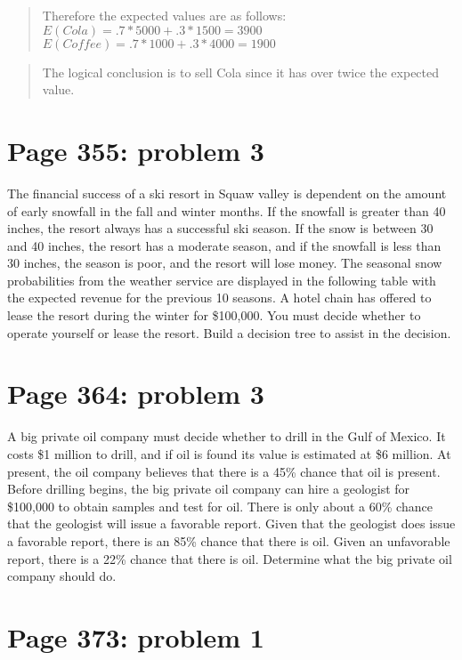 \documentclass[]{article}
\begin{document}
\begin{quote}
Therefore the expected values are as follows:\\
\(E(Cola) = .7 * 5000 + .3 * 1500 = 3900\)\\
\(E(Coffee) = .7 * 1000 + .3 * 4000 = 1900\)
\end{quote}

\begin{quote}
The logical conclusion is to sell Cola since it has over twice the
expected value.
\end{quote}

\section{Page 355: problem 3}\label{page-355-problem-3}

The financial success of a ski resort in Squaw valley is dependent on
the amount of early snowfall in the fall and winter months. If the
snowfall is greater than 40 inches, the resort always has a successful
ski season. If the snow is between 30 and 40 inches, the resort has a
moderate season, and if the snowfall is less than 30 inches, the season
is poor, and the resort will lose money. The seasonal snow probabilities
from the weather service are displayed in the following table with the
expected revenue for the previous 10 seasons. A hotel chain has offered
to lease the resort during the winter for \$100,000. You must decide
whether to operate yourself or lease the resort. Build a decision tree
to assist in the decision.

\section{Page 364: problem 3}\label{page-364-problem-3}

A big private oil company must decide whether to drill in the Gulf of
Mexico. It costs \$1 million to drill, and if oil is found its value is
estimated at \$6 million. At present, the oil company believes that
there is a 45\% chance that oil is present. Before drilling begins, the
big private oil company can hire a geologist for \$100,000 to obtain
samples and test for oil. There is only about a 60\% chance that the
geologist will issue a favorable report. Given that the geologist does
issue a favorable report, there is an 85\% chance that there is oil.
Given an unfavorable report, there is a 22\% chance that there is oil.
Determine what the big private oil company should do.

\section{Page 373: problem 1}\label{page-373-problem-1}
\end{document}
